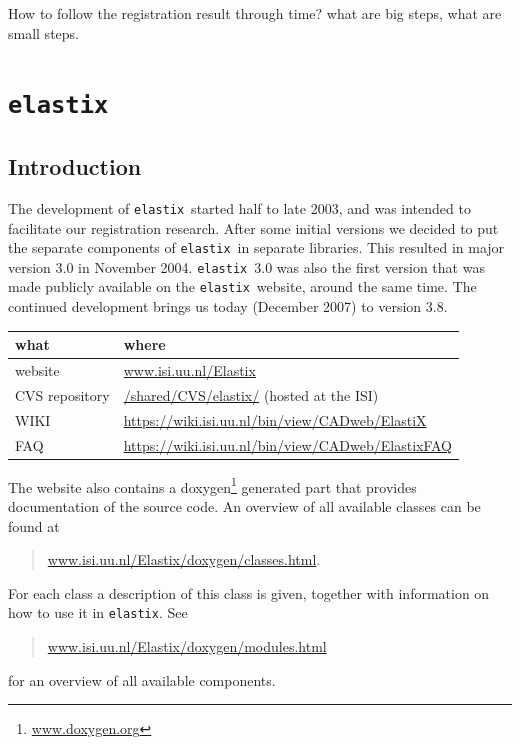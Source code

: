 \documentclass[]{report}
\newcommand{\elastix}{\texttt{elastix}}
\begin{document}
How to follow the registration result through time? what are big
steps, what are small steps.



\chapter{\elastix}\label{chp:elastix}

\section{Introduction}\label{sec:elastix:intro}

The development of \elastix\ started half to late 2003, and was
intended to facilitate our registration research. After some initial
versions we decided to put the separate components of \elastix\ in
separate libraries. This resulted in major version 3.0 in November
2004. \elastix\ 3.0 was also the first version that was made publicly
available on the \elastix\ website, around the same time. The
continued development brings us today (December 2007) to version 3.8.

\begin{table}[h!]
\begin{tabular}{l|l}
what & where \\
\hline
website        & \url{www.isi.uu.nl/Elastix} \\
CVS repository & \url{/shared/CVS/elastix/} (hosted at the ISI) \\
WIKI           & \url{https://wiki.isi.uu.nl/bin/view/CADweb/ElastiX} \\
FAQ            &
\url{https://wiki.isi.uu.nl/bin/view/CADweb/ElastixFAQ}
\end{tabular}
\end{table}

The website also contains a doxygen\footnote{\url{www.doxygen.org}}
generated part that provides documentation of the source code. An
overview of all available classes can be found at
\begin{quote}
\url{www.isi.uu.nl/Elastix/doxygen/classes.html}.
\end{quote}
For each class a description of this class is given, together with
information on how to use it in \elastix. See
\begin{quote}
\url{www.isi.uu.nl/Elastix/doxygen/modules.html}
\end{quote}
for an overview of all available components.
\end{document}

